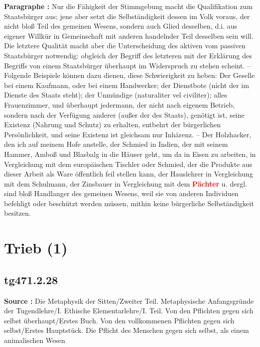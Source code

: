 \documentclass[a4paper,12pt,twoside]{book}
\newcommand{\match}[1]{\textcolor{red}{\textbf{#1}}}
\newcommand{\unnumberedsection}[1]{
	\section*{#1}
	\addcontentsline{toc}{section}{#1}
	\markright{#1}
}
\begin{document}
	\textbf{Paragraphe : }Nur die Fähigkeit der Stimmgebung macht die Qualifikation zum Staatsbürger aus; jene aber setzt die Selbständigkeit dessen im Volk voraus, der nicht bloß Teil des gemeinen Wesens, sondern auch Glied desselben, d.i. aus eigener Willkür in Gemeinschaft mit anderen handelnder  Teil desselben sein will. Die letztere Qualität macht aber die Unterscheidung des aktiven vom passiven Staatsbürger notwendig: obgleich der Begriff des letzteren mit der Erklärung des Begriffs von einem Staatsbürger überhaupt im Widerspruch zu stehen scheint. – Folgende Beispiele können dazu dienen, diese Schwierigkeit zu heben: Der Geselle bei einem Kaufmann, oder bei einem Handwerker; der Dienstbote (nicht der im Dienste des Staats steht); der Unmündige (naturaliter vel civiliter); alles Frauenzimmer, und überhaupt jedermann, der nicht nach eigenem Betrieb, sondern nach der Verfügung anderer (außer der des Staats), genötigt ist, seine Existenz (Nahrung und Schutz) zu erhalten, entbehrt der bürgerlichen Persönlichkeit, und seine Existenz ist gleichsam nur Inhärenz. – Der Holzhacker, den ich auf meinem Hofe anstelle, der Schmied in Indien, der mit seinem Hammer, Amboß und Blasbalg in die Häuser geht, um da in Eisen zu arbeiten, in Vergleichung mit dem europäischen Tischler oder Schmied, der die Produkte aus dieser Arbeit als Ware öffentlich feil stellen kann, der Hauslehrer in Vergleichung mit dem Schulmann, der Zinsbauer in Vergleichung mit dem \match{Pächter} u. dergl. sind bloß Handlanger des gemeinen Wesens, weil sie von anderen Individuen befehligt oder beschützt werden müssen, mithin keine bürgerliche Selbständigkeit besitzen. 
	
	\unnumberedsection{Trieb (1)} 
	\subsection*{tg471.2.28} 
	\textbf{Source : }Die Metaphysik der Sitten/Zweiter Teil. Metaphysische Anfangsgründe der Tugendlehre/I. Ethische Elementarlehre/I. Teil. Von den Pflichten gegen sich selbst überhaupt/Erstes Buch. Von den vollkommenen Pflichten gegen sich selbst/Erstes Hauptstück. Die Pflicht des Menschen gegen sich selbst, als einem animalischen Wesen\\  
	
\end{document}
